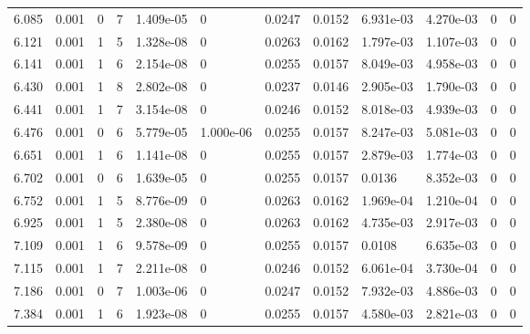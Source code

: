 \documentclass[preview]{standalone}
\begin{document}
{{{\begin{tabular}{L{1.2cm}C{1.2cm} C{0.3cm}C{0.5cm} C{1.4cm}C{1.4cm} C{1.4cm}C{1.4cm} C{1.6cm}C{1.6cm} C{1.6cm}C{1.6cm}}
  6.085  &  0.001  & 0     &  7 &  1.409e-05  & 0  &  0.0247&   0.0152& 6.931e-03 & 4.270e-03   &  0 & 0  \\ 
  6.121  &  0.001  & 1     &  5 &  1.328e-08  & 0  &  0.0263&   0.0162& 1.797e-03 & 1.107e-03   &  0 & 0  \\ 
  6.141  &  0.001  & 1     &  6 &  2.154e-08  & 0  &  0.0255&   0.0157& 8.049e-03 & 4.958e-03   &  0 & 0  \\ 
  6.430  &  0.001  & 1     &  8 &  2.802e-08  & 0  &  0.0237&   0.0146& 2.905e-03 & 1.790e-03   &  0 & 0  \\ 
  6.441  &  0.001  & 1     &  7 &  3.154e-08  & 0  &  0.0246&   0.0152& 8.018e-03 & 4.939e-03   &  0 & 0  \\ 
  6.476  &  0.001  & 0     &  6 &  5.779e-05  & 1.000e-06  &  0.0255&   0.0157& 8.247e-03 & 5.081e-03   &  0 & 0  \\ 
  6.651  &  0.001  & 1     &  6 &  1.141e-08  & 0  &  0.0255&   0.0157& 2.879e-03 & 1.774e-03   &  0 & 0  \\ 
  6.702  &  0.001  & 0     &  6 &  1.639e-05  & 0  &  0.0255&   0.0157& 0.0136 & 8.352e-03   &  0 & 0  \\ 
  6.752  &  0.001  & 1     &  5 &  8.776e-09  & 0  &  0.0263&   0.0162& 1.969e-04 & 1.210e-04   &  0 & 0  \\ 
  6.925  &  0.001  & 1     &  5 &  2.380e-08  & 0  &  0.0263&   0.0162& 4.735e-03 & 2.917e-03   &  0 & 0  \\ 
  7.109  &  0.001  & 1     &  6 &  9.578e-09  & 0  &  0.0255&   0.0157& 0.0108 & 6.635e-03   &  0 & 0  \\ 
  7.115  &  0.001  & 1     &  7 &  2.211e-08  & 0  &  0.0246&   0.0152& 6.061e-04 & 3.730e-04   &  0 & 0  \\ 
  7.186  &  0.001  & 0     &  7 &  1.003e-06  & 0  &  0.0247&   0.0152& 7.932e-03 & 4.886e-03   &  0 & 0  \\ 
  7.384  &  0.001  & 1     &  6 &  1.923e-08  & 0  &  0.0255&   0.0157& 4.580e-03 & 2.821e-03   &  0 & 0  \\ 
\hline 
\end{tabular} 

}}}
\end{document}
